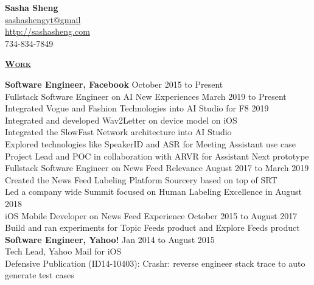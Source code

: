 \documentclass{article}
\newlength{\remaining}
\newcommand{\titleline}[1]{
\setlength{\remaining}{\textwidth-\widthof{\textsc{#1}}}
\noindent\underline{\textsc{#1}\hspace*{\remaining}}\par}
\begin{document}
    \thispagestyle{empty}
    \begin{center}
         \large{\textbf{Sasha Sheng}} \\
         \href{mailto:sashashengyt@gmail}{sashashengyt@gmail} \\
         \href{http://sashasheng.com}{http://sashasheng.com} \\
         734-834-7849
    \end{center}
  
    \titleline{\textbf{\large{Work}}}
 	\noindent\textbf{Software Engineer, Facebook} \hfill October 2015 to Present \\ 
		\indent Fullstack Software Engineer on AI New Experiences \hfill March 2019 to Present \\
		\indent\indent Integrated Vogue and Fashion Technologies into AI Studio for F8 2019 \\
		\indent\indent Integrated and developed Wav2Letter on device model on iOS  \\
		\indent\indent Integrated the SlowFast Network architecture into AI Studio \\
		\indent\indent Explored technologies like SpeakerID and ASR for Meeting Assistant use case \\
		\indent\indent Project Lead and POC in collaboration with ARVR for Assistant Next prototype \\
		\indent Fullstack Software Engineer on News Feed Relevance \hfill August 2017 to March 2019 \\
		\indent\indent Created the News Feed Labeling Platform Sourcery based on top of SRT \\
		\indent\indent Led a company wide Summit focused on Human Labeling Excellence in August 2018 \\
    		\indent iOS Mobile Developer on News Feed Experience \hfill October 2015 to August 2017 \\
		\indent\indent Build and ran experiments for Topic Feeds product and Explore Feeds product \\
    	\noindent\textbf{Software Engineer, Yahoo!} \hfill Jan 2014 to August 2015 \\
    		\indent Tech Lead, Yahoo Mail for iOS \\
                 \indent Defensive Publication (ID14-10403): Crashr: reverse engineer stack trace to auto generate test cases \\
                 
\end{document}
